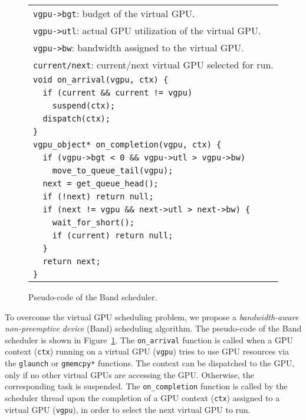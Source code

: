 \begin{figure}[t]
 \begin{center}
  \begin{tabular}{l}
   \hline
   \hline
   {\small \verb|vgpu->bgt|: budget of the virtual GPU.}\\
   {\small \verb|vgpu->utl|: actual GPU utilization of the virtual GPU.}\\
   {\small \verb|vgpu->bw|: bandwidth assigned to the virtual
   GPU.}\\
   {\small \verb|current/next|: current/next virtual GPU selected for run.}\\
   \hline
   {\small \verb|void on_arrival(vgpu, ctx) {|}\\
   {\small \verb|  if (current && current != vgpu)|}\\
   {\small \verb|    suspend(ctx);|}\\
   {\small \verb|  dispatch(ctx);|}\\
   {\small \verb|}|}\\
   {\small \verb|vgpu_object* on_completion(vgpu, ctx) {|}\\
   {\small \verb|  if (vgpu->bgt < 0 && vgpu->utl > vgpu->bw)|}\\
   {\small \verb|    move_to_queue_tail(vgpu);|}\\
   {\small \verb|  next = get_queue_head();|}\\
   {\small \verb|  if (!next) return null;|}\\
   {\small \verb|  if (next != vgpu && next->utl > next->bw) {|}\\
   {\small \verb|    wait_for_short();|}\\
   {\small \verb|    if (current) return null;|}\\
   {\small \verb|  }|}\\
   {\small \verb|  return next;|}\\
   {\small \verb|}|}\\
   \hline
  \end{tabular}
  \caption{Pseudo-code of the Band scheduler.}
  \label{fig:band}
 \end{center}
 \vspace{-1.5em}
\end{figure}

To overcome the virtual GPU scheduling problem, we propose a
\textit{bandwidth-aware non-preemptive device} (Band) scheduling
algorithm.
The pseudo-code of the Band scheduler is shown in
Figure~\ref{fig:band}.
The \texttt{on\_arrival} function is called when a GPU context
(\texttt{ctx}) running on a virtual GPU (\texttt{vgpu}) tries to use GPU
resources via the \texttt{glaunch} or \texttt{gmemcpy*} functions.
The context can be dispatched to the GPU, only if no other virtual GPUs
are accessing the GPU.
Otherwise, the corresponding task is suspended.
The \texttt{on\_completion} function is called by the scheduler thread
upon the completion of a GPU context (\texttt{ctx}) assigned to a virtual
GPU (\texttt{vgpu}), in order to select the next virtual GPU to run.

